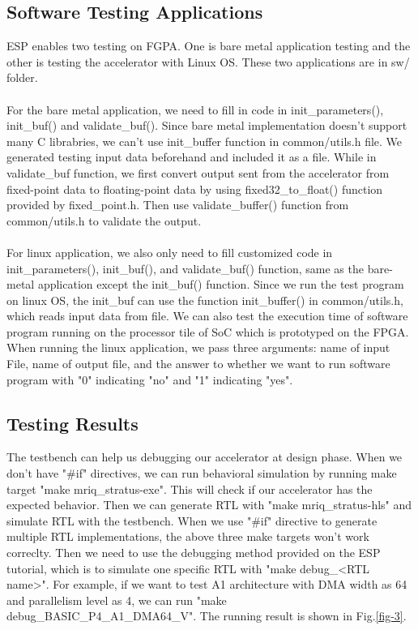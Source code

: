 \subsection{Software Testing Applications}

ESP enables two testing on FGPA. One is bare metal application testing and the
other is testing the accelerator with Linux OS. These two applications are in
sw/ folder. \\ \\ For the bare metal application, we need to fill in code in
init\_parameters(), init\_buf() and validate\_buf(). Since bare metal
implementation doesn't support many C librabries, we can't use init\_buffer
function in common/utils.h file. We generated testing input data beforehand and
included it as a file. While in validate\_buf function, we first convert output
sent from the accelerator from fixed-point data to floating-point data by using
fixed32\_to\_float() function provided by fixed\_point.h. Then use
validate\_buffer() function from common/utils.h to validate the
output. \\ \\ For linux application, we also only need to fill customized code
in init\_parameters(), init\_buf(), and validate\_buf() function, same as the
bare-metal application except the init\_buf() function. Since we run the test
program on linux OS, the init\_buf can use the function init\_buffer() in
common/utils.h, which reads input data from file. We can also test the execution
time of software program running on the processor tile of SoC which is
prototyped on the FPGA. When running the linux application, we pass three
arguments: name of input File, name of output file, and the answer to whether we
want to run software program with "0" indicating "no" and "1" indicating "yes".
\\
\subsection{Testing Results}

The testbench can help us debugging our accelerator at design phase. When we
don't have "\#if" directives, we can run behavioral simulation by running make
target "make mriq\_stratus-exe". This will check if our accelerator has the
expected behavior. Then we can generate RTL with "make mriq\_stratus-hls" and
simulate RTL with the testbench. When we use "\#if" directive to generate
multiple RTL implementations, the above three make targets won't work
correclty. Then we need to use the debugging method provided on the ESP
tutorial, which is to simulate one specific RTL with "make debug\_<RTL
name>". For example, if we want to test A1 architecture with DMA width as 64 and
parallelism level as 4, we can run "make debug\_BASIC\_P4\_A1\_DMA64\_V". The
running result is shown in Fig.\ref{fig-3}.  \\

